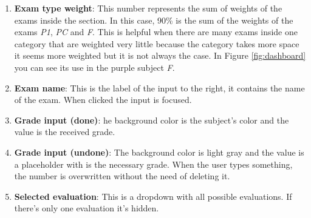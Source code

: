 \begin{enumerate}[itemsep=0mm]
    \item \textbf{Exam type weight}: This number represents the sum of weights of the exams inside the section. In this case, 90\% is the sum of the weights of the exams \textit{P1}, \textit{PC} and \textit{F}. This is helpful when there are many exams inside one category that are weighted very little because the category takes more space it seems more weighted but it is not always the case. In Figure \ref{fig:dashboard} you can see its use in the purple subject \textit{F}.
    \item \textbf{Exam name}: This is the label of the input to the right, it contains the name of the exam. When clicked the input is focused.
    \item \textbf{Grade input (done)}: he background color is the subject's color and the value is the received grade.
    \item \textbf{Grade input (undone)}: The background color is light gray and the value is a placeholder with is the necessary grade. When the user types something, the number is overwritten without the need of deleting it.
    \item \textbf{Selected evaluation}: This is a dropdown with all possible evaluations. If there's only one evaluation it's hidden.
\end{enumerate}

